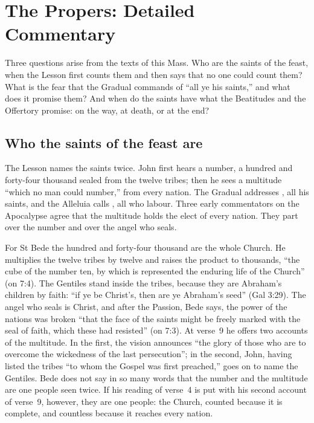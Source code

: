 
\section{The Propers: Detailed Commentary}

Three questions arise from the texts of this Mass. Who are the saints of the
feast, when the Lesson first counts them and then says that no one could
count them? What is the fear that the Gradual commands of ``all ye his
saints,'' and what does it promise them? And when do the saints have what the
Beatitudes and the Offertory promise: on the way, at death, or at the end?

\subsection{Who the saints of the feast are}

The Lesson names the saints twice. John first hears a number, a hundred and
forty-four thousand sealed from the twelve tribes; then he sees a multitude
``which no man could number,'' from every nation. The Gradual addresses
, all his saints, and the Alleluia calls , all who labour. Three early commentators on the Apocalypse
agree that the multitude holds the elect of every nation. They part over the
number and over the angel who seals.

For St Bede the hundred and forty-four thousand are the whole Church. He
multiplies the twelve tribes by twelve and raises the product
to thousands, ``the cube of the number ten, by which is represented the
enduring life of the Church'' (on 7:4). The Gentiles stand inside the tribes,
because they are Abraham's children by faith: ``if ye be Christ's, then are ye
Abraham's seed'' (Gal 3:29). The angel who seals is Christ, and after the
Passion, Bede says, the power of the nations was broken ``that the face of the
saints might be freely marked with the seal of faith, which these had
resisted'' (on 7:3). At verse~9 he offers two accounts of the multitude. In
the first, the vision announces ``the glory of those who are to overcome the
wickedness of the last persecution''; in the second, John, having listed the
tribes ``to whom the Gospel was first preached,'' goes on to name the
Gentiles. Bede does not say in so many words that the number and the
multitude are one people seen twice. If his reading of verse~4 is put with his
second account of verse~9, however, they are one people: the Church, counted
because it is complete, and countless because it reaches every nation.

